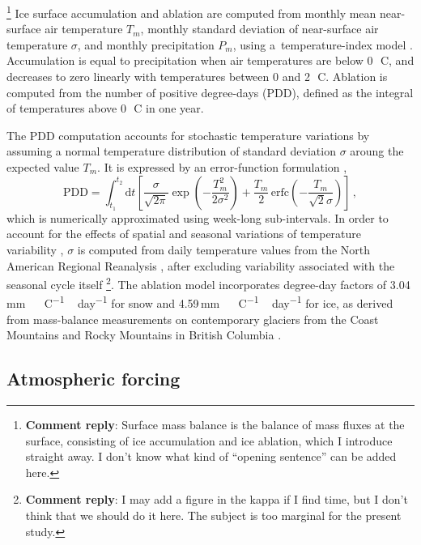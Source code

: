 \documentclass[tc, manuscript]{copernicus}
\newcommand{\renote}[1]{\footnote{\textbf{Comment reply}: #1}}
\begin{document}
\renote{
    Surface mass balance is the balance of mass fluxes at the surface,
    consisting of ice accumulation and ice ablation, which I introduce straight
    away. I don't know what kind of ``opening sentence'' can be added here.}
Ice surface accumulation and ablation are computed from monthly mean
near-surface air temperature $T_m$, monthly standard deviation of near-surface
air temperature $\sigma$, and monthly precipitation $P_m$, using
a~temperature-index model \citep[e.g.,][]{Hock.2003}. Accumulation is equal to
precipitation when air temperatures are below 0\,\unit{{\degree}C}, and
decreases to zero linearly with temperatures between 0 and
2\,\unit{{\degree}C}. Ablation is computed from the number of positive
degree-days (PDD), defined as the integral of temperatures above
0\,\unit{{\degree}C} in one year.

The PDD computation accounts for stochastic temperature variations by assuming
a normal temperature distribution of standard deviation $\sigma$ aroung the
expected value $T_m$. It is expressed by an error-function formulation
\citep{Calov.Greve.2005},
\begin{equation}
    \label{eqn:calovgreve}
    \mathrm{PDD} = \int_{t_1}^{t_2} \mathrm{d}t
        \left[\frac{\sigma}{\sqrt{2\pi}}
                \exp\left({-\frac{T_{m}^2}{2\sigma^2}}\right)
              + \frac{T_{m}}{2} \, \mathrm{erfc}
                \left(-\frac{T_{m}}{\sqrt{2}\sigma}\right)\right] \,,
\end{equation}
which is numerically approximated using week-long sub-intervals. In order to
account for the effects of spatial and seasonal variations of temperature
variability \citep{Seguinot.2013}, $\sigma$ is computed from daily temperature
values from the North American Regional Reanalysis
\citep[NARR,][]{Mesinger.etal.2006}, after excluding variability associated
with the seasonal cycle itself \citep[cf.][]{Seguinot.Rogozhina.2014}\renote{
    I may add a figure in the kappa if I find time, but I don't think that we
    should do it here. The subject is too marginal for the present study.}.
The ablation model incorporates degree-day factors of
3.04\,\unit{mm\,{\degree}C^{-1}\,day^{-1}} for snow and
4.59\,\unit{mm\,{\degree}C^{-1}\,day^{-1}} for ice, as derived from
mass-balance measurements on contemporary glaciers from the Coast Mountains and
Rocky Mountains in British Columbia \citep{Shea.etal.2009}.

\subsection{Atmospheric forcing}
\label{sec:atm}
\end{document}
